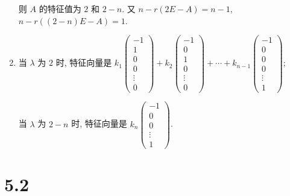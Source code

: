 \begin{enumerate}
			       则 \( A \) 的特征值为 \( 2 \) 和 \( 2-n \). 又 \( n - r(2E - A) = n - 1 \), \( n - r((2-n)E - A) = 1 \).
			 \item %
			       当 \( \lambda \) 为 \( 2 \) 时, 特征向量是 \( k_{1}\begin{pmatrix}
				       -1     \\
				       1      \\
				       0      \\
				       0      \\
				       \vdots \\
				       0
			       \end{pmatrix} + k_{2}\begin{pmatrix}
				       -1     \\
				       0      \\
				       1      \\
				       0      \\
				       \vdots \\
				       0
			       \end{pmatrix} + \cdots + k_{n-1}\begin{pmatrix}
				       -1     \\
				       0      \\
				       0      \\
				       0      \\
				       \vdots \\
				       1
			       \end{pmatrix} \);

			       当 \( \lambda \) 为 \( 2-n \) 时, 特征向量是 \( k_{n}\begin{pmatrix}
				       -1     \\
				       0      \\
				       0      \\
				       \vdots \\
				       1
			       \end{pmatrix} \).
		 \end{enumerate}


\section{5.2}

 \subsection{} %
